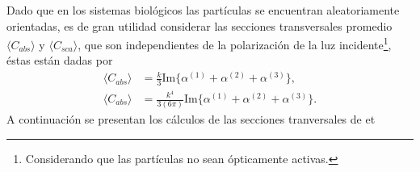 Dado que en los sistemas biológicos las partículas se encuentran aleatoriamente orientadas, es de gran utilidad considerar las secciones transversales promedio $\langle C_{abs}\rangle$ y $\langle C_{sca}\rangle$, que son independientes de la polarización de la luz incidente\footnote{Considerando que las partículas no sean ópticamente activas.}, éstas están dadas por \cite{Bohren}
\begin{align*}
	\langle C_{abs}\rangle &= \frac{k}{3} \text{Im}\{\alpha^{(1)}+\alpha^{(2)}+\alpha^{(3)}\},\\
	\langle C_{abs}\rangle &= \frac{k^4}{3(6\pi)} \text{Im}\{\alpha^{(1)}+\alpha^{(2)}+\alpha^{(3)}\}.
\end{align*}
A continuación se presentan los cálculos de las secciones tranversales de et